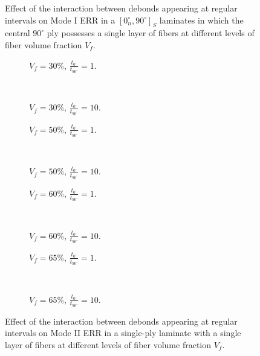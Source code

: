 \documentclass[review]{elsarticle}
\begin{document}
\begin{figure}[!h]
\caption{Effect of the interaction between debonds appearing at regular intervals on Mode I ERR in a $\left[0^{\circ}_{n}, 90^{\circ}\right]_{S}$ laminates in which the central $90^{\circ}$ ply possesses a single layer of fibers at different levels of fiber volume fraction $V_{f}$.}\label{fig:sidefibersMI}
\end{figure}

\begin{figure}[!h]
\centering
   \begin{subfigure}[b]{0.45\textwidth}
        \caption{$V_{f}=30\%$, $\frac{t_{0^{\circ}}}{t_{90^{\circ}}}=1$.}\label{subfig:sidefiber30MIIthick1}
    \end{subfigure} ~
    \begin{subfigure}[b]{0.45\textwidth}
         \caption{$V_{f}=30\%$, $\frac{t_{0^{\circ}}}{t_{90^{\circ}}}=10$.}\label{subfig:sidefiber30MIIthick10}
    \end{subfigure}

   \begin{subfigure}[b]{0.45\textwidth}
        \caption{$V_{f}=50\%$, $\frac{t_{0^{\circ}}}{t_{90^{\circ}}}=1$.}\label{subfig:sidefiber50MIIthick1}
    \end{subfigure} ~
    \begin{subfigure}[b]{0.45\textwidth}
         \caption{$V_{f}=50\%$, $\frac{t_{0^{\circ}}}{t_{90^{\circ}}}=10$.}\label{subfig:sidefiber50MIIthick10}
    \end{subfigure}

    \begin{subfigure}[b]{0.45\textwidth}
        \caption{$V_{f}=60\%$, $\frac{t_{0^{\circ}}}{t_{90^{\circ}}}=1$.}\label{subfig:sidefiber60MIIthick1}
    \end{subfigure} ~
    \begin{subfigure}[b]{0.45\textwidth}
        \caption{$V_{f}=60\%$, $\frac{t_{0^{\circ}}}{t_{90^{\circ}}}=10$.}\label{subfig:sidefiber60MIIthick10}
    \end{subfigure}

    \begin{subfigure}[b]{0.45\textwidth}
        \caption{$V_{f}=65\%$, $\frac{t_{0^{\circ}}}{t_{90^{\circ}}}=1$.}\label{subfig:sidefiber65MIIthick1}
    \end{subfigure} ~
    \begin{subfigure}[b]{0.45\textwidth}
        \caption{$V_{f}=65\%$, $\frac{t_{0^{\circ}}}{t_{90^{\circ}}}=10$.}\label{subfig:sidefiber65MIIthick10}
    \end{subfigure}

\caption{Effect of the interaction between debonds appearing at regular intervals on Mode II ERR in a single-ply laminate with a single layer of fibers at different levels of fiber volume fraction $V_{f}$.}\label{fig:sidefibersMII}
\end{figure}
\end{document}
